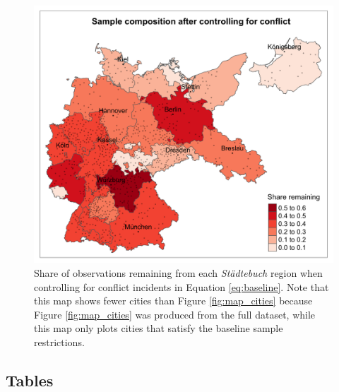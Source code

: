 \documentclass[11pt, a4paper]{article}
\begin{document}
\begin{figure}[ht]
    \centering
    \includegraphics[scale = 0.15]{paper/output/descriptive/map_conflict_NA_50y.png}
    \caption{Share of observations remaining from each \textit{Städtebuch} region when controlling for conflict incidents in Equation \eqref{eq:baseline}. Note that this map shows fewer cities than Figure \ref{fig:map_cities} because Figure \ref{fig:map_cities} was produced from the full dataset, while this map only plots cities that satisfy the baseline sample restrictions.}
    \label{fig:conflict_map}
\end{figure}

\clearpage
\subsection*{Tables}






\end{document}
